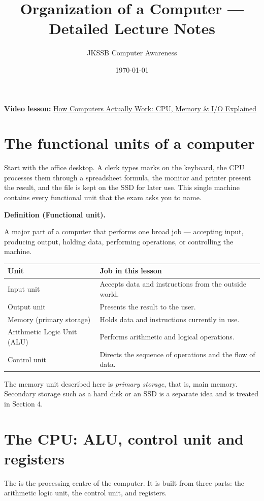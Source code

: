 \documentclass[11pt]{article}
\title{Organization of a Computer --- Detailed Lecture Notes}
\author{JKSSB Computer Awareness}
\date{\today}
\newenvironment{definitionbox}[1]{%
  \par\noindent\textbf{Definition (#1).}\ \itshape
}{\par\vspace{0.3em}}
\begin{document}
\maketitle

\noindent\textbf{Video lesson:}
\href{https://youtu.be/92XQ_n1t_cc}{How Computers Actually Work: CPU, Memory \& I/O Explained}

\section{The functional units of a computer}
Start with the office desktop. A clerk types marks on the keyboard, the CPU
processes them through a spreadsheet formula, the monitor and printer present
the result, and the file is kept on the SSD for later use. This single machine
contains every functional unit that the exam asks you to name.

\begin{definitionbox}{Functional unit}
A major part of a computer that performs one broad job --- accepting input,
producing output, holding data, performing operations, or controlling the
machine.
\end{definitionbox}

\begin{center}
\begin{tabular}{p{}p{}}
\toprule
\textbf{Unit} & \textbf{Job in this lesson}\\
\midrule
Input unit & Accepts data and instructions from the outside world.\\
Output unit & Presents the result to the user.\\
Memory (primary storage) & Holds data and instructions currently in use.\\
Arithmetic Logic Unit (ALU) & Performs arithmetic and logical operations.\\
Control unit & Directs the sequence of operations and the flow of data.\\
\bottomrule
\end{tabular}
\end{center}

The memory unit described here is \emph{primary storage}, that is, main
memory. Secondary storage such as a hard disk or an SSD is a separate idea and
is treated in Section 4.

\section{The CPU: ALU, control unit and registers}
The  is the processing centre of the
computer. It is built from three parts: the arithmetic logic unit, the control
unit, and registers.
\end{document}
